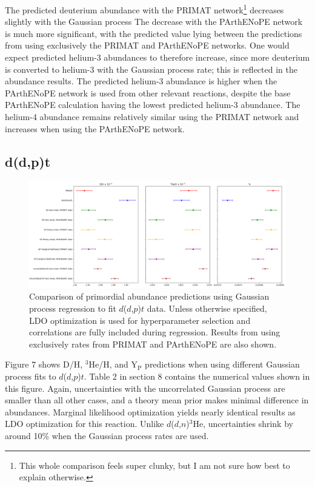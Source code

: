 \documentclass[%
 reprint,
superscriptaddress,
nofootinbib,
 amsmath,amssymb,
 aps,
 pra,
]{revtex4-2}
\begin{document}
The predicted deuterium abundance with the PRIMAT network\footnote{This whole comparison feels super clunky, but I am not sure how best to explain otherwise. } decreases slightly with the Gaussian process The decrease with the PArthENoPE network is much more significant, with the predicted value lying between the predictions from using exclusively the PRIMAT and PArthENoPE networks. One would expect predicted helium-3 abundances to therefore increase, since more deuterium is converted to helium-3 with the Gaussian process rate; this is reflected in the abundance results. The predicted helium-3 abundance is higher when the PArthENoPE network is used from other relevant reactions, despite the base PArthENoPE calculation having the lowest predicted helium-3 abundance. The helium-4 abundance remains relatively similar using the PRIMAT network and increases when using the PArthENoPE network. 

\subsection{d(d,p)t}

\begin{figure}
	\centering
	\includegraphics[width=0.98\linewidth]{Figures/ddtp_comp.png}
	\caption{Comparison of primordial abundance predictions using Gaussian process regression to fit $d$($d$,$p$)$t$ data. Unless otherwise specified, LDO optimization is used for hyperparameter selection and correlations are fully included during regression. Results from using exclusively rates from PRIMAT and PArthENoPE are also shown.}
\end{figure}

Figure 7 shows D/H, $^3$He/H, and Y$_\text{P}$ predictions when using different Gaussian process fits to $d$($d$,$p$)$t$. Table 2 in section 8 contains the numerical values shown in this figure. Again, uncertainties with the uncorrelated Gaussian process are smaller than all other cases, and a theory mean prior makes minimal difference in abundances. Marginal likelihood optimization yields nearly identical results as LDO optimization for this reaction. Unlike $d$($d$,$n$)$^3$He, uncertainties shrink by around 10\% when the Gaussian process rates are used.
\end{document}
